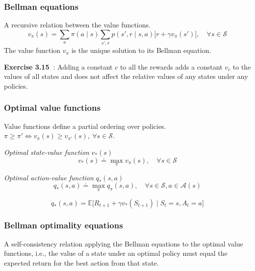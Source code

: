 \subsubsection{Bellman equations}

A recursive relation between the value functions.
\begin{equation}
    v_\pi(s) = \sum_{a} \pi(a \mid s) \sum_{s', r} p(s', r \mid s, a) \Big[ r + \gamma v_\pi(s') \Big]
    , \quad \forall s \in \mathcal{S}
\end{equation}
The value function \( v_\pi \) is the unique solution to its Bellman equation.

\textbf{Exercise 3.15~\cite{Sutton1998}}:
Adding a constant \( c \) to all the rewards adds a constant \( v_c \) to the values of all states and does not affect the relative values of any states under any policies.

\subsubsection{Optimal value functions}

Value functions define a partial ordering over policies.
\( \pi \geq \pi' \iff v_\pi(s) \geq v_{\pi'}(s), \ \forall s \in \mathcal{S} \).

\textit{Optimal state-value function} \( v_*(s) \)
\begin{equation}
    v_*(s) \doteq \max_{\pi} v_\pi(s)
    , \quad \forall s \in \mathcal{S}
\end{equation}

\textit{Optimal action-value function} \( q_*(s, a) \)
\begin{equation}
    q_*(s, a) \doteq \max_{\pi} q_\pi(s, a)
    , \quad \forall s \in \mathcal{S}, a \in \mathcal{A}(s)
\end{equation}

\begin{equation}
    q_*(s, a) = \mathbb{E} \big[ R_{t+1} + \gamma v_*(S_{t+1}) \;\big|\; S_t = s, A_t = a \big]
\end{equation}

\subsubsection{Bellman optimality equations}

A self-consistency relation applying the Bellman equations to the optimal value functions, i.e., the value of a state under an optimal policy must equal the expected return for the best action from that state.

